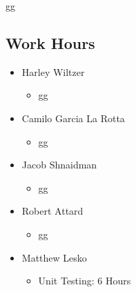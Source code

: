 \documentclass[12pt]{article}
\begin{document}
 gg

 \subsection{Work Hours}

 \begin{itemize}
     \item Harley Wiltzer
 		\begin{itemize}
 			\item gg
 		\end{itemize}
     \item Camilo Garcia La Rotta
     \begin{itemize}
         \item gg
     \end{itemize}
     \item Jacob Shnaidman
     \begin{itemize}
         \item gg
     \end{itemize}
     \item Robert Attard
     \begin{itemize}
         \item gg
     \end{itemize}
     \item Matthew Lesko
     \begin{itemize}
     	\item Unit Testing: 6 Hours
     \end{itemize}
 \end{itemize}




\end{document}
